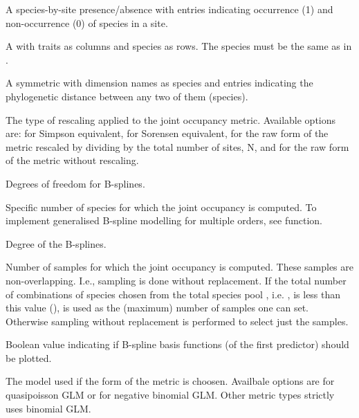 \documentclass[a4paper]{book}
\begin{document}
\begin{Arguments}
\begin{ldescription}
\item[\code{s.data}] A species-by-site presence/absence  with entries indicating
occurrence (1) and non-occurrence (0) of species in a site.

\item[\code{t.data}] A  with traits as columns and species as rows. The species must be the same as in .

\item[\code{p.d.mat}] A symmetric  with dimension names as species and entries indicating the
phylogenetic distance between any two of them (species).

\item[\code{metric}] The type of rescaling applied to the joint occupancy metric. Available options are:
 for Simpson equivalent,  for Sorensen equivalent,  for the
raw form of the metric rescaled by dividing by the total number of sites, N, and  for the
raw form of the metric without rescaling.

\item[\code{d.f}] Degrees of freedom for B-splines.

\item[\code{order.jo}] Specific number of species for which the joint occupancy is computed. To implement
generalised B-spline modelling for multiple orders, see  function.

\item[\code{degree}] Degree of the B-splines.

\item[\code{n}] Number of samples for which the joint occupancy is computed. These samples are non-overlapping.
I.e., sampling is done without replacement. If the total number of combinations of  species chosen
from the total species pool , i.e. , is less than this value (),  is
used as the (maximum) number of samples one can set. Otherwise sampling without replacement is
performed to select just the  samples.

\item[\code{b.plots}] Boolean value indicating if B-spline basis functions (of the first predictor) should be plotted.

\item[\code{gbsm.model}] The model used if the  form of the metric is choosen. Availbale options are 
for quasipoisson GLM or  for negative binomial GLM. Other metric types strictly uses binomial GLM.


\end{ldescription}
\end{Arguments}
\end{document}
